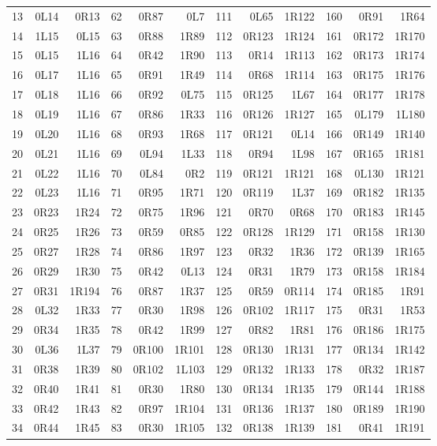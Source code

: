 \begin{center}
\begin{tabular}{@{}rrr@{\hspace{11pt}}rrr@{\hspace{11pt}}rrr@{\hspace{11pt}}rrr@{}}
13 & 0L14 & 0R13 & 62 & 0R87 & 0L7 & 111 & 0L65 & 1R122 & 160 & 0R91 & 1R64 \\
14 & 1L15 & 0L15 & 63 & 0R88 & 1R89 & 112 & 0R123 & 1R124 & 161 & 0R172 & 1R170 \\
15 & 0L15 & 1L16 & 64 & 0R42 & 1R90 & 113 & 0R14 & 1R113 & 162 & 0R173 & 1R174 \\
16 & 0L17 & 1L16 & 65 & 0R91 & 1R49 & 114 & 0R68 & 1R114 & 163 & 0R175 & 1R176 \\
17 & 0L18 & 1L16 & 66 & 0R92 & 0L75 & 115 & 0R125 & 1L67 & 164 & 0R177 & 1R178 \\
18 & 0L19 & 1L16 & 67 & 0R86 & 1R33 & 116 & 0R126 & 1R127 & 165 & 0L179 & 1L180 \\
19 & 0L20 & 1L16 & 68 & 0R93 & 1R68 & 117 & 0R121 & 0L14 & 166 & 0R149 & 1R140 \\
20 & 0L21 & 1L16 & 69 & 0L94 & 1L33 & 118 & 0R94 & 1L98 & 167 & 0R165 & 1R181 \\
21 & 0L22 & 1L16 & 70 & 0L84 & 0R2 & 119 & 0R121 & 1R121 & 168 & 0L130 & 1R121 \\
22 & 0L23 & 1L16 & 71 & 0R95 & 1R71 & 120 & 0R119 & 1L37 & 169 & 0R182 & 1R135 \\
23 & 0R23 & 1R24 & 72 & 0R75 & 1R96 & 121 & 0R70 & 0R68 & 170 & 0R183 & 1R145 \\
24 & 0R25 & 1R26 & 73 & 0R59 & 0R85 & 122 & 0R128 & 1R129 & 171 & 0R158 & 1R130 \\
25 & 0R27 & 1R28 & 74 & 0R86 & 1R97 & 123 & 0R32 & 1R36 & 172 & 0R139 & 1R165 \\
26 & 0R29 & 1R30 & 75 & 0R42 & 0L13 & 124 & 0R31 & 1R79 & 173 & 0R158 & 1R184 \\
27 & 0R31 & 1R194 & 76 & 0R87 & 1R37 & 125 & 0R59 & 0R114 & 174 & 0R185 & 1R91 \\
28 & 0L32 & 1R33 & 77 & 0R30 & 1R98 & 126 & 0R102 & 1R117 & 175 & 0R31 & 1R53 \\
29 & 0R34 & 1R35 & 78 & 0R42 & 1R99 & 127 & 0R82 & 1R81 & 176 & 0R186 & 1R175 \\
30 & 0L36 & 1L37 & 79 & 0R100 & 1R101 & 128 & 0R130 & 1R131 & 177 & 0R134 & 1R142 \\
31 & 0R38 & 1R39 & 80 & 0R102 & 1L103 & 129 & 0R132 & 1R133 & 178 & 0R32 & 1R187 \\
32 & 0R40 & 1R41 & 81 & 0R30 & 1R80 & 130 & 0R134 & 1R135 & 179 & 0R144 & 1R188 \\
33 & 0R42 & 1R43 & 82 & 0R97 & 1R104 & 131 & 0R136 & 1R137 & 180 & 0R189 & 1R190 \\
34 & 0R44 & 1R45 & 83 & 0R30 & 1R105 & 132 & 0R138 & 1R139 & 181 & 0R41 & 1R191 \\

\end{tabular}
\end{center}
